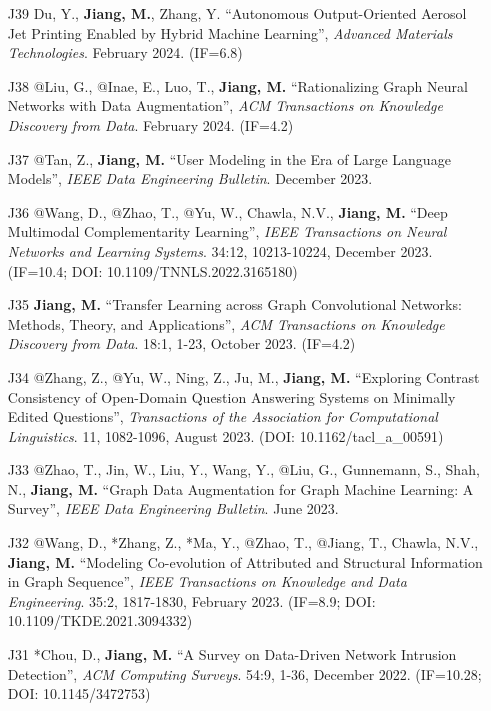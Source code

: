 \documentclass[10pt]{article}
\newenvironment{myindentpar}[1]%
{\begin{list}{}%
         {\setlength{\leftmargin}{#1}}%
         \item[]%
}
{\end{list}}
\newcounter{list}
\begin{document}
\begin{myindentpar}{0.00cm}
\begin{enumerate}[leftmargin=.5cm]
\item[J39] Du, Y., \textbf{Jiang, M.}, Zhang, Y. ``Autonomous Output-Oriented Aerosol Jet Printing Enabled by Hybrid Machine Learning'', \textit{Advanced Materials Technologies}. February 2024. (IF=6.8)

\item[J38] @Liu, G., @Inae, E., Luo, T., \textbf{Jiang, M.} ``Rationalizing Graph Neural Networks with Data Augmentation'', \textit{ACM Transactions on Knowledge Discovery from Data}. February 2024. (IF=4.2)

\item[J37] @Tan, Z., \textbf{Jiang, M.} ``User Modeling in the Era of Large Language Models'', \textit{IEEE Data Engineering Bulletin}. December 2023.

\item[J36] @Wang, D., @Zhao, T., @Yu, W., Chawla, N.V., \textbf{Jiang, M.} ``Deep Multimodal Complementarity Learning'', \textit{IEEE Transactions on Neural Networks and Learning Systems}. 34:12, 10213-10224, December 2023. (IF=10.4; DOI: 10.1109/TNNLS.2022.3165180)

\item[J35] \textbf{Jiang, M.} ``Transfer Learning across Graph Convolutional Networks: Methods, Theory, and Applications'', \textit{ACM Transactions on Knowledge Discovery from Data}. 18:1, 1-23, October 2023. (IF=4.2)	

\item[J34] @Zhang, Z., @Yu, W., Ning, Z., Ju, M., \textbf{Jiang, M.} ``Exploring Contrast Consistency of Open-Domain Question Answering Systems on Minimally Edited Questions'', \textit{Transactions of the Association for Computational Linguistics}. 11, 1082-1096, August 2023. (DOI: 10.1162/tacl\_a\_00591)
	
\item[J33] @Zhao, T., Jin, W., Liu, Y., Wang, Y., @Liu, G., Gunnemann, S., Shah, N., \textbf{Jiang, M.} ``Graph Data Augmentation for Graph Machine Learning: A Survey'', \textit{IEEE Data Engineering Bulletin}. June 2023.
	
\item[J32] @Wang, D., *Zhang, Z., *Ma, Y., @Zhao, T., @Jiang, T., Chawla, N.V., \textbf{Jiang, M.} ``Modeling Co-evolution of Attributed and Structural Information in Graph Sequence'', \textit{IEEE Transactions on Knowledge and Data Engineering}. 35:2, 1817-1830, February 2023. (IF=8.9; DOI: 10.1109/TKDE.2021.3094332)

\item[J31] *Chou, D., \textbf{Jiang, M.} ``A Survey on Data-Driven Network Intrusion Detection'', \textit{ACM Computing Surveys}. 54:9, 1-36, December 2022. (IF=10.28; DOI: 10.1145/3472753)


\end{enumerate}
\end{myindentpar}
\end{document}
